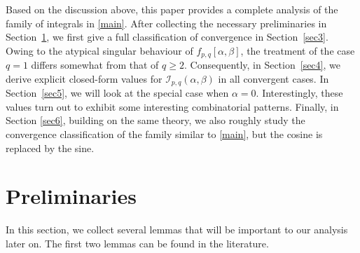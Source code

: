 \documentclass[12pt, reqno]{amsart}
\theoremstyle{plain}
\newtheorem{lemma}[theorem]{Lemma}
\theoremstyle{definition}
\begin{document}
Based on the discussion above, this paper provides a complete analysis of the family of integrals in \eqref{main}. After collecting the necessary preliminaries in Section~\ref{sec2}, we first give a full classification of convergence in Section~\ref{sec3}. Owing to the atypical singular behaviour of \(f_{p,q}[\alpha,\beta]\), the treatment of the case \(q=1\) differs somewhat from that of \(q\ge 2\). Consequently, in Section~\ref{sec4}, we derive explicit closed-form values for \(\mathcal{I}_{p,q}(\alpha,\beta)\) in all convergent cases. In Section~\ref{sec5}, we will look at the special case when $\alpha=0$. Interestingly, these values turn out to exhibit some interesting combinatorial patterns. Finally, in Section \ref{sec6}, building on the same theory, we also roughly study the convergence classification of the family similar to \eqref{main}, but the cosine is replaced by the sine.




\section{Preliminaries}\label{sec2}







In this section, we collect several lemmas that will be important to our analysis later on. The first two lemmas can be found in the literature.
\end{document}
